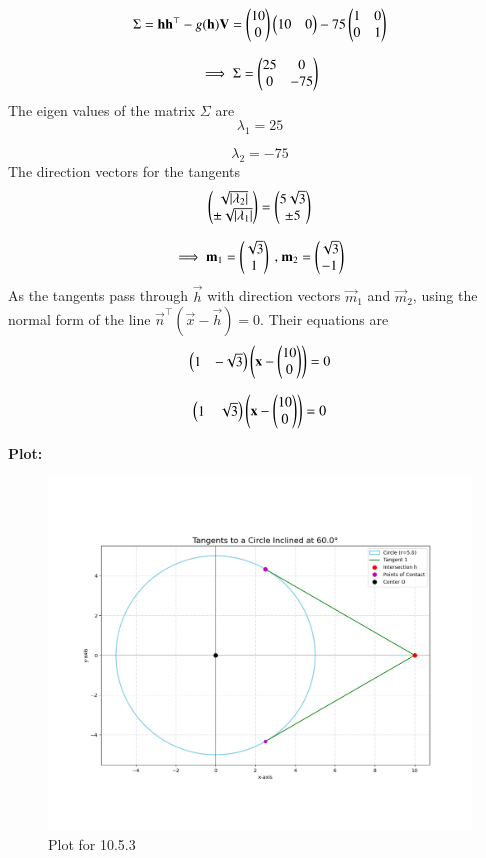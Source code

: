\documentclass[journal,12pt,onecolumn]{IEEEtran}
\theoremstyle{remark}
\begin{document}
\begin{equation}
    \Sigma = \mathbf{h}\mathbf{h}^{\top} - g(\mathbf{h})\mathbf{V} = \begin{pmatrix}10\\0\end{pmatrix}\begin{pmatrix}10&0\end{pmatrix} - 75\begin{pmatrix}1&0\\0&1\end{pmatrix}
\end{equation}

\begin{equation}
    \implies \Sigma = \begin{pmatrix}25&0\\0&-75\end{pmatrix}
\end{equation}
The eigen values of the matrix $\Sigma$ are 
\begin{equation}
    \lambda_1 = 25
\end{equation}

\begin{equation}
    \lambda_2 = -75
\end{equation}
The direction vectors for the tangents
\begin{equation}
    \begin{pmatrix}\sqrt{\left\vert\lambda_2\right\vert}\\ \pm \sqrt{\left\vert\lambda_1\right\vert}\end{pmatrix} = \begin{pmatrix}5\sqrt{3}\\ \pm 5\end{pmatrix}
\end{equation}

\begin{equation}
    \implies \mathbf{m}_1 = \begin{pmatrix}\sqrt{3}\\1\end{pmatrix} \text{ , } \mathbf{m}_2 = \begin{pmatrix}\sqrt{3}\\-1\end{pmatrix}
\end{equation}
As the tangents pass through $\vec{h}$ with direction vectors $\vec{m}_1$ and $\vec{m}_2$, using the normal form of the line $\vec{n}^{\top}(\vec{x}-\vec{h}) = 0$.
Their equations are
\begin{equation}
    \begin{pmatrix}1&-\sqrt{3}\end{pmatrix}\left(\mathbf{x} - \begin{pmatrix}10\\0\end{pmatrix}\right) = 0
\end{equation}

\begin{equation}
    \begin{pmatrix}1&\sqrt{3}\end{pmatrix}\left(\mathbf{x} - \begin{pmatrix}10\\0\end{pmatrix}\right) = 0
\end{equation}

\textbf{Plot: }\\

\begin{figure}[H]
    \centering
    \includegraphics[width=0.80\columnwidth]{figs/1.png}
    \caption{Plot for 10.5.3}
\end{figure}
\end{document}
